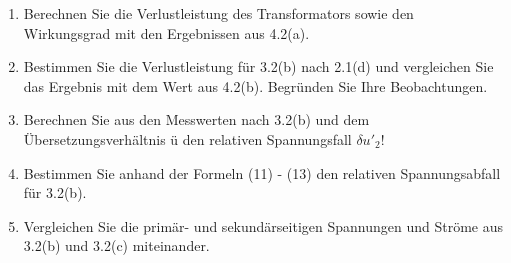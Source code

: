 \begin{enumerate}[label=\alph*)]
	\item Berechnen Sie die Verlustleistung des Transformators sowie den Wirkungsgrad mit
	      den Ergebnissen aus 4.2(a).

	\item Bestimmen Sie die Verlustleistung für 3.2(b) nach 2.1(d) und vergleichen Sie
	      das Ergebnis mit dem Wert aus 4.2(b). Begründen Sie Ihre Beobachtungen.

	\item Berechnen Sie aus den Messwerten nach 3.2(b) und dem Übersetzungsverhältnis ü
	      den relativen Spannungsfall $\delta u'_2$!

	\item Bestimmen Sie anhand der Formeln (11) - (13) den relativen Spannungsabfall für
	      3.2(b).

	\item Vergleichen Sie die primär- und sekundärseitigen Spannungen und Ströme aus
	      3.2(b) und 3.2(c) miteinander.
\end{enumerate}
